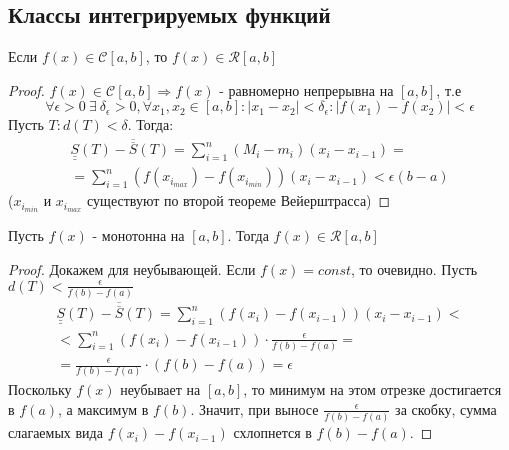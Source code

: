 \subsection{Классы интегрируемых функций}
\begin{theorem}
    Если $f(x)\in \mathcal{C}[a,b]$, то $f(x)\in \mathcal{R}[a,b]$
\end{theorem} 
\begin{proof}
    $f(x)\in \mathcal{C}[a,b] \Rightarrow f(x)$ - равномерно непрерывна на $[a,b]$, т.е
    \[\forall \epsilon>0\ \exists\ \delta_{\epsilon}>0, \forall x_1, x_2\in [a,b]: |x_1-x_2|<\delta_{\epsilon}: |f(x_1)-f(x_2)|<\epsilon\]
    Пусть $T: d(T)<\delta$. Тогда:
    \begin{align*}
    \underline{\underline{S}}(T)-\overline{\overline{S}}(T)=\sum\limits_{i=1}^{n}(M_i-m_i)(x_i-x_{i-1})=\\=\sum\limits_{i=1}^{n}(f(x_{i_{max}})-f(x_{i_{min}}))(x_i-x_{i-1})<\epsilon(b-a)
    \end{align*}
    ($x_{i_{min}}$ и $x_{i_{max}}$ существуют по второй теореме Вейерштрасса)
\end{proof} 
\begin{theorem}
    Пусть $f(x)$ - монотонна на $[a,b]$. Тогда $f(x)\in \mathcal{R}[a,b]$
\end{theorem} 
\begin{proof}
    Докажем для неубывающей. Если $f(x)=const$, то очевидно.
    Пусть $d(T)<\frac{\epsilon}{f(b)-f(a)}$
    \begin{multline*}
        \underline{\underline{S}}(T)-\overline{\overline{S}}(T)=\sum\limits_{i=1}^{n}(f(x_i)-f(x_{i-1}))(x_i-x_{i-1})<\\
        <\sum\limits_{i=1}^{n}(f(x_i)-f(x_{i-1}))\cdot \frac{\epsilon}{f(b)-f(a)}=\\
        =\frac{\epsilon}{f(b)-f(a)}\cdot (f(b)-f(a))=\epsilon
    \end{multline*}
    Поскольку $f(x)$ неубывает на $[a,b]$, то минимум на этом отрезке достигается в $f(a)$, а максимум в $f(b)$. Значит, при выносе $\frac{\epsilon}{f(b)-f(a)}$ за скобку, сумма слагаемых вида $f(x_i)-f(x_{i-1})$ схлопнется в $f(b)-f(a)$.
\end{proof} 
